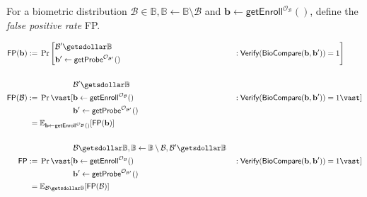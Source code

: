\begin{definition}
For a biometric distribution $\mathcal{B} \in \mathbb{B}, \mathbb{B} \gets \mathbb{B} \setminus \mathcal{B}$ and $\mathbf{b} \gets \mathsf{getEnroll}^{\mathcal{O}_\mathcal{B}}()$, define the \emph{false positive rate} \textsf{FP}.

\begin{alignat*}{2}
	\mathsf{FP}(\mathbf{b}) 
	:=&\; \Pr \Bigg[ 
		\begin{aligned}
			& \mathcal{B}^\prime \getsdollar \mathbb{B} \\
			& \mathbf{b}^\prime \gets \mathsf{getProbe}^{\mathcal{O}_{\mathcal{B}^\prime}}()
		\end{aligned}
		&&: \mathsf{Verify}(\mathsf{BioCompare}(\mathbf{b}, \mathbf{b}^\prime)) = 1 \Bigg] \\
	\\
	\mathsf{FP}(\mathcal{B}) 
	:=&\; \Pr \vast[ 
		\begin{aligned}
			& \mathcal{B}^\prime \getsdollar \mathbb{B} \\
			& \mathbf{b} \gets \mathsf{getEnroll}^{\mathcal{O}_\mathcal{B} }() \\
			& \mathbf{b}^\prime \gets \mathsf{getProbe}^{\mathcal{O}_{\mathcal{B}^\prime} }()
		\end{aligned}
		&&: \mathsf{Verify}(\mathsf{BioCompare}(\mathbf{b}, \mathbf{b}^\prime)) = 1 \vast] \\
	=&\; \mathbb{E}_{ \mathbf{b} \gets \mathsf{getEnroll}^{\mathcal{O}_\mathcal{B}}() }[\mathsf{FP}(\mathbf{b})] \\
	\\
	\mathsf{FP} 
	:=&\; \Pr \vast[
		\begin{aligned}
			& \mathcal{B} \getsdollar \mathbb{B}, \mathbb{B} \gets \mathbb{B} \setminus \mathcal{B}, \mathcal{B}^\prime \getsdollar \mathbb{B} \\
			& \mathbf{b} \gets \mathsf{getEnroll}^{\mathcal{O}_\mathcal{B} }() \\
			& \mathbf{b}^\prime \gets \mathsf{getProbe}^{\mathcal{O}_{\mathcal{B}^\prime} }()
		\end{aligned}
		&&: \mathsf{Verify}(\mathsf{BioCompare}(\mathbf{b}, \mathbf{b}^\prime)) = 1 \vast] \\
	=&\; \mathbb{E}_{\mathcal{B} \getsdollar \mathbb{B}}[\mathsf{FP}(\mathcal{B})]
\end{alignat*}

\end{definition}

